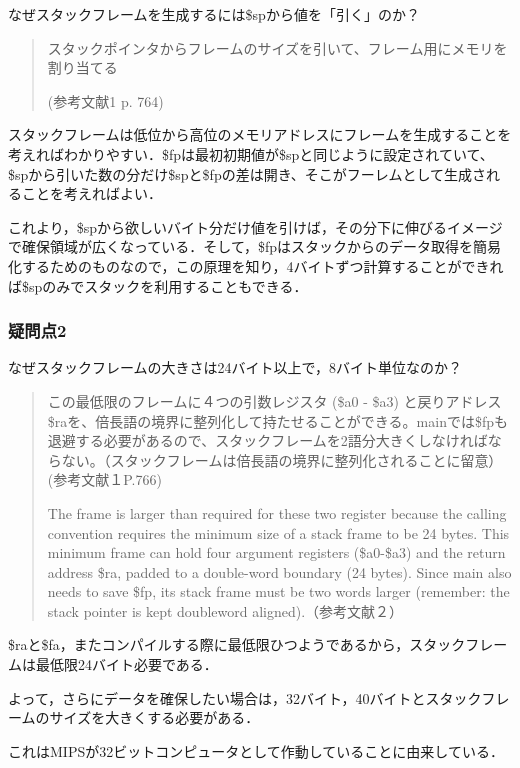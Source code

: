 \documentclass[a4j]{jarticle}
\begin{document}
なぜスタックフレームを生成するには\$spから値を「引く」のか？

\begin{quote}
スタックポインタからフレームのサイズを引いて、フレーム用にメモリを割り当てる 

(参考文献1 p. 764)
\end{quote}

スタックフレームは低位から高位のメモリアドレスにフレームを生成することを考えればわかりやすい．\$fpは最初初期値が\$spと同じように設定されていて、\$spから引いた数の分だけ\$spと\$fpの差は開き、そこがフーレムとして生成されることを考えればよい．

これより，\$spから欲しいバイト分だけ値を引けば，その分下に伸びるイメージで確保領域が広くなっている．そして，\$fpはスタックからのデータ取得を簡易化するためのものなので，この原理を知り，4バイトずつ計算することができれば\$spのみでスタックを利用することもできる．

\subsubsection{疑問点2}

なぜスタックフレームの大きさは24バイト以上で，8バイト単位なのか？  

\begin{quote}
この最低限のフレームに４つの引数レジスタ (\$a0 - \$a3) と戻りアドレス\$raを、倍長語の境界に整列化して持たせることができる。mainでは\$fpも退避する必要があるので、スタックフレームを2語分大きくしなければならない。（スタックフレームは倍長語の境界に整列化されることに留意）(参考文献１P.766)

The frame is larger than required for these two register because the calling convention requires the minimum size of a stack frame to be 24 bytes. This minimum frame can hold four argument registers (\$a0-\$a3) and the return address \$ra, padded to a double-word boundary (24 bytes). Since main also needs to save \$fp, its stack frame must be two words larger (remember: the stack pointer is kept doubleword aligned).（参考文献２）
\end{quote}

\$raと\$fa，またコンパイルする際に最低限ひつようであるから，スタックフレームは最低限24バイト必要である．

よって，さらにデータを確保したい場合は，32バイト，40バイトとスタックフレームのサイズを大きくする必要がある．

これはMIPSが32ビットコンピュータとして作動していることに由来している．
\end{document}
